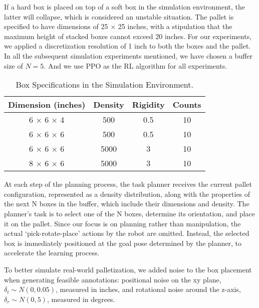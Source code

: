 If a hard box is placed on top of a soft box in the simulation environment, the latter will collapse, which is considered an unstable situation. The pallet is specified to have dimensions of 25 $\times$ 25 inches, with a stipulation that the maximum height of stacked boxes cannot exceed 20 inches. For our experiments, we applied a discretization resolution of 1 inch to both the boxes and the pallet. In all the subsequent simulation experiments mentioned, we have chosen a buffer size of $N=5$. And we use PPO \cite{schulman2017proximal} as the RL algorithm for all experiments.

\begin{table}[t]
    \centering
    \caption{Box Specifications in the Simulation Environment.}
    \label{tab:box_specifications}
    \begin{tabular}{cccc}
        \toprule
        Dimension (inches) & Density & Rigidity & Counts\\
        \midrule
        6 $\times$ 6 $\times$ 4 & 500 & 0.5 & 10\\
        6 $\times$ 6 $\times$ 6 & 500 & 0.5 & 10\\
        6 $\times$ 6 $\times$ 6 & 5000 & 3 & 10\\
        8 $\times$ 6 $\times$ 6 & 5000 & 3 & 10\\
        \bottomrule
    \end{tabular}
    \vspace{-9pt}
\end{table}

At each step of the planning process, the task planner receives the current pallet configuration, represented as a density distribution, along with the properties of the next N boxes in the buffer, which include their dimensions and density. The planner’s task is to select one of the N boxes, determine its orientation, and place it on the pallet. Since our focus is on planning rather than manipulation, the actual `pick-rotate-place' actions by the robot are omitted. Instead, the selected box is immediately positioned at the goal pose determined by the planner, to accelerate the learning process.

To better simulate real-world palletization, we added noise to the box placement when generating feasible annotations: positional noise on the xy plane, $\delta_t \sim N(0, 0.05)$, measured in inches, and rotational noise around the z-axis, $\delta_r \sim N(0,5)$, measured in degrees.

